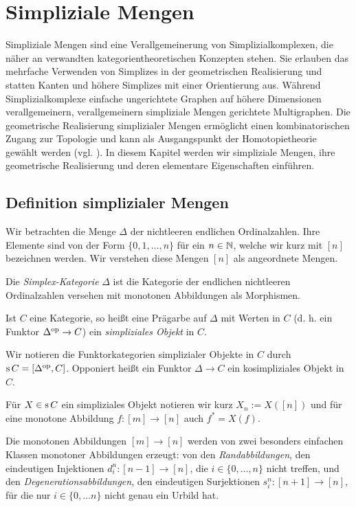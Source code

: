 
\chapter{Simpliziale Mengen}
\label{ch:simp-sets}

Simpliziale Mengen sind eine Verallgemeinerung von
Simplizialkomplexen, die näher an verwandten kategorientheoretischen
Konzepten stehen. Sie erlauben das mehrfache Verwenden von Simplizes
in der geometrischen Realisierung und statten Kanten und höhere
Simplizes mit einer Orientierung aus. Während Simplizialkomplexe
einfache ungerichtete Graphen auf höhere Dimensionen verallgemeinern,
verallgemeinern simpliziale Mengen gerichtete Multigraphen. Die
geometrische Realisierung simplizialer Mengen ermöglicht einen
kombinatorischen Zugang zur Topologie und kann als Ausgangspunkt der
Homotopietheorie gewählt werden (vgl. \cite{GJ}). In diesem Kapitel
werden wir simpliziale Mengen, ihre geometrische Realisierung und
deren elementare Eigenschaften einführen.

\section{Definition simplizialer Mengen}

Wir betrachten die Menge $\Delta$ der nichtleeren endlichen
Ordinalzahlen. Ihre Elemente sind von der Form $\{0, 1, \dots, n\}$
für ein $n \in \mathbb{N}$, welche wir kurz mit $[n]$ bezeichnen werden. Wir
verstehen diese Mengen $[n]$ als angeordnete Mengen.

\begin{defn} \label{def:delta}
  Die \emph{Simplex-Kategorie} $\Delta$ ist die Kategorie der
  endlichen nichtleeren Ordinalzahlen versehen mit monotonen
  Abbildungen als Morphismen.

  Ist $C$ eine Kategorie, so heißt eine Prägarbe auf $\Delta$ mit
  Werten in $C$ (d. h. ein Funktor $\Delta^\mathrm{op} \to C$) ein
  \emph{simpliziales Objekt} in $C$.
\end{defn}
Wir notieren die Funktorkategorien simplizialer Objekte in $C$ durch
$\operatorname{s} C = [\Delta^\mathrm{op}, C]$. Opponiert heißt ein Funktor $\Delta \to C$
ein kosimpliziales Objekt in $C$.

Für $X \in \operatorname{s} C$ ein simpliziales Objekt notieren wir kurz $X_n :=
X([n])$ und für eine monotone Abbildung $f: [m] \to [n]$ auch $f^* =
X(f)$.

Die monotonen Abbildungen $[m] \to [n]$ werden von zwei besonders
einfachen Klassen monotoner Abbildungen erzeugt: von den
\emph{Randabbildungen}, den eindeutigen Injektionen $d_i^n: [n - 1]
\to [n]$, die $i \in \{0, \dots, n\}$ nicht treffen, und den
\emph{Degenerationsabbildungen}, den eindeutigen Surjektionen $s_i^n:
     [n + 1] \to [n]$, für die nur $i \in \{0, \dots n\}$ nicht genau
     ein Urbild hat.
 
